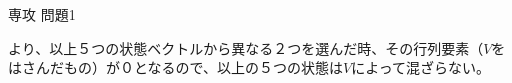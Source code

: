 \documentclass[fleqn]{jbook}
\begin{document}
\begin{answer}{専攻 問題1}{}
\begin{subanswers}
より、以上５つの状態ベクトルから異なる２つを選んだ時、その行列要素（$V$をはさんだもの）が０となるので、以上の５つの状態は$V$によって混ざらない。

\end{subanswers}
\end{answer}
\end{document}
